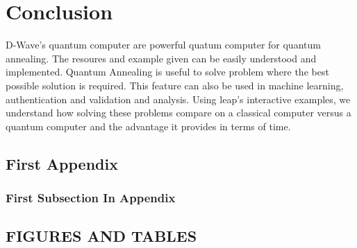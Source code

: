 \documentclass[12pt,conference]{IEEEtran}
\begin{document}
\section{Conclusion}
D-Wave's quantum computer are powerful quatum computer for quantum annealing. The resoures and example given can be easily understood and implemented. Quantum Annealing is useful to solve problem where the best possible solution is required. This feature can also be used in machine learning, authentication and validation and analysis. Using leap's interactive examples, we understand how solving these problems compare on a classical computer versus a quantum computer and the advantage it provides in terms of time. 


\appendix

\subsection{First Appendix}
\label{FirstAppendix}

\subsubsection{First Subsection In Appendix}
\label{FirstSubsectionAppendix}

\subsection{FIGURES AND TABLES}

\listoffigures

\end{document}
